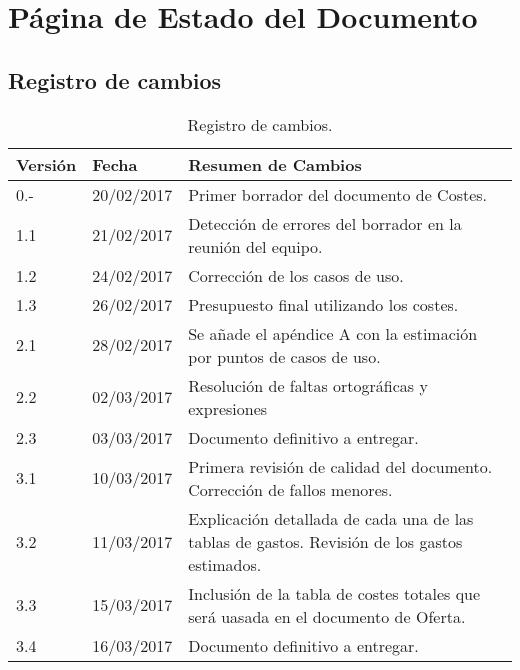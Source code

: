 \section{Página de Estado del Documento}

\subsection{Registro de cambios}
\begin{table}[htbp]
\begin{center}
\begin{tabular}{l l p{11cm} }
\textbf{Versión}&\textbf{Fecha}&\textbf{Resumen de Cambios}\\
\hline \hline
0.- & 20/02/2017 & Primer borrador del documento de Costes.\\
\hline
1.1 & 21/02/2017 & Detección de errores del borrador en la reunión del equipo.\\
\hline
1.2 & 24/02/2017 & Corrección de los casos de uso.\\
\hline
1.3 & 26/02/2017 & Presupuesto final utilizando los costes.\\
\hline
2.1 & 28/02/2017 & Se añade el apéndice A con la estimación por puntos de casos de uso.\\
\hline
2.2 & 02/03/2017 & Resolución de faltas ortográficas y expresiones\\
\hline
2.3 & 03/03/2017 & Documento definitivo a entregar.\\
\hline
3.1 & 10/03/2017 & Primera revisión de calidad del documento. Corrección de fallos menores.\\
\hline
3.2 & 11/03/2017 & Explicación detallada de cada una de las tablas de gastos. Revisión de los gastos estimados.\\
\hline
3.3 & 15/03/2017 & Inclusión de la tabla de costes totales que será uasada en el documento de Oferta.\\
\hline
3.4 & 16/03/2017 & Documento definitivo a entregar.\\
\hline
\end{tabular}
\caption{Registro de cambios.}
\label{tabla:changeReg}
\end{center}
\end{table}

